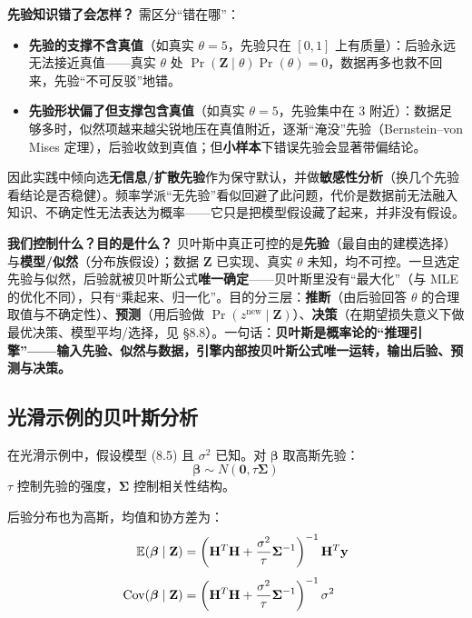 \textbf{先验知识错了会怎样？} 需区分“错在哪”：
\begin{itemize}
    \item \textbf{先验的支撑不含真值}（如真实 $\theta = 5$，先验只在 $[0,1]$ 上有质量）：后验永远无法接近真值——真实 $\theta$ 处 $\Pr(\mathbf{Z}\mid\theta)\Pr(\theta) = 0$，数据再多也救不回来，先验“不可反驳”地错。
    \item \textbf{先验形状偏了但支撑包含真值}（如真实 $\theta = 5$，先验集中在 3 附近）：数据足够多时，似然项越来越尖锐地压在真值附近，逐渐“淹没”先验（Bernstein--von Mises 定理），后验收敛到真值；但\textbf{小样本}下错误先验会显著带偏结论。
\end{itemize}
因此实践中倾向选\textbf{无信息/扩散先验}作为保守默认，并做\textbf{敏感性分析}（换几个先验看结论是否稳健）。频率学派“无先验”看似回避了此问题，代价是数据前无法融入知识、不确定性无法表达为概率——它只是把模型假设藏了起来，并非没有假设。

\textbf{我们控制什么？目的是什么？} 贝叶斯中真正可控的是\textbf{先验}（最自由的建模选择）与\textbf{模型/似然}（分布族假设）；数据 $\mathbf{Z}$ 已实现、真实 $\theta$ 未知，均不可控。一旦选定先验与似然，后验就被贝叶斯公式\textbf{唯一确定}——贝叶斯里没有“最大化”（与 MLE 的优化不同），只有“乘起来、归一化”。目的分三层：\textbf{推断}（由后验回答 $\theta$ 的合理取值与不确定性）、\textbf{预测}（用后验做 $\Pr(z^{\text{new}}\mid\mathbf{Z})$）、\textbf{决策}（在期望损失意义下做最优决策、模型平均/选择，见 §8.8）。一句话：\textbf{贝叶斯是概率论的“推理引擎”——输入先验、似然与数据，引擎内部按贝叶斯公式唯一运转，输出后验、预测与决策。}

\subsection{光滑示例的贝叶斯分析}

在光滑示例中，假设模型 (8.5) 且 $\sigma^2$ 已知。对 $\bm{\beta}$ 取高斯先验：
\begin{equation}\label{eq:gaussian_prior}
    \bm{\beta} \sim N(\mathbf{0}, \tau\mathbf{\Sigma})
\end{equation}
$\tau$ 控制先验的强度，$\mathbf{\Sigma}$ 控制相关性结构。

后验分布也为高斯，均值和协方差为：
\begin{equation}\label{eq:posterior_beta}
    \begin{aligned}
        \mathbb{E}(\bm{\beta} \mid \mathbf{Z}) &= \left(\mathbf{H}^T\mathbf{H} + \frac{\sigma^2}{\tau}\mathbf{\Sigma}^{-1}\right)^{-1}\mathbf{H}^T\mathbf{y} \\[4pt]
        \mathrm{Cov}(\bm{\beta} \mid \mathbf{Z}) &= \left(\mathbf{H}^T\mathbf{H} + \frac{\sigma^2}{\tau}\mathbf{\Sigma}^{-1}\right)^{-1}\sigma^2
    \end{aligned}
\end{equation}

